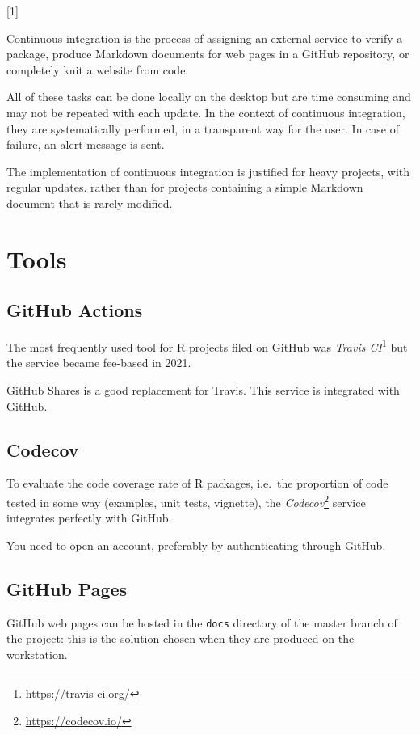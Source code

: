 \documentclass[
  12pt,
  american,
  a4paper,
  extrafontsizes,onecolumn,openright
  ]{memoir}
\newlength{\rf}
\newcommand{\toc}[1]{%
  \startcontents[chapters]%
  \printcontents[chapters]{}{1}[#1]{}%
  ~\newline%
}
\begin{document}
\toc{1}

Continuous integration is the process of assigning an external service to verify a package, produce Markdown documents for web pages in a GitHub repository, or completely knit a website from code.

All of these tasks can be done locally on the desktop but are time consuming and may not be repeated with each update.
In the context of continuous integration, they are systematically performed, in a transparent way for the user.
In case of failure, an alert message is sent.

The implementation of continuous integration is justified for heavy projects, with regular updates.
rather than for projects containing a simple Markdown document that is rarely modified.

\section{Tools}\label{tools}

\subsection{GitHub Actions}\label{github-actions}

The most frequently used tool for R projects filed on GitHub was \emph{Travis CI}\footnote{\url{https://travis-ci.org/}} but the service became fee-based in 2021.

GitHub Shares is a good replacement for Travis.
This service is integrated with GitHub.

\subsection{Codecov}\label{codecov}

To evaluate the code coverage rate of R packages, i.e.~the proportion of code tested in some way (examples, unit tests, vignette), the \emph{Codecov}\footnote{\url{https://codecov.io/}} service integrates perfectly with GitHub.

You need to open an account, preferably by authenticating through GitHub.

\subsection{GitHub Pages}\label{github-pages}

GitHub web pages can be hosted in the \texttt{docs} directory of the master branch of the project: this is the solution chosen when they are produced on the workstation.
\end{document}
